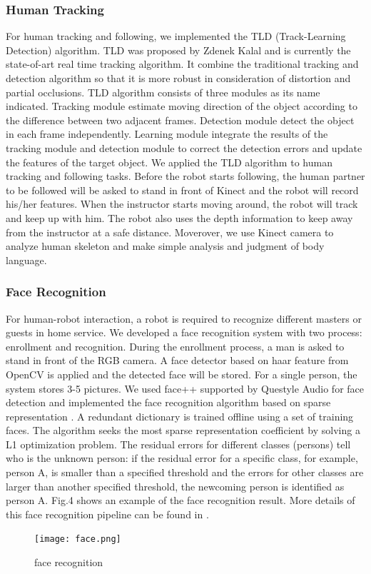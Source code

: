 \subsubsection{Human Tracking}
For human tracking and following, we implemented the TLD (Track-Learning Detection) algorithm\cite{kalal2012tracking}. TLD was proposed by Zdenek Kalal and is currently the state-of-art real time tracking algorithm. It combine the traditional tracking and detection algorithm so that it is more robust in consideration of distortion and partial occlusions. TLD algorithm consists of three modules as its name indicated. Tracking module estimate moving direction of the object according to the difference between two adjacent frames. Detection module detect the object in each frame independently. Learning module integrate the results of the tracking module and detection module to correct the detection errors and update the features of the target object.
We applied the TLD algorithm to human tracking and following tasks. Before the robot starts following, the human partner to be followed will be asked to stand in front of Kinect and the robot will record his/her features. When the instructor starts moving around, the robot will track and keep up with him. The robot also uses the depth information to keep away from the instructor at a safe distance.
Moverover, we use Kinect camera to analyze human skeleton and make simple analysis and judgment of body language. 
\subsubsection{Face Recognition}
For human-robot interaction, a robot is required to recognize different masters or guests in home service. We developed a face recognition system with two process: enrollment and recognition. During the enrollment process, a man is asked to stand in front of the RGB camera. A face detector based on haar feature from OpenCV is applied and the detected face will be stored. For a single person, the system stores 3-5 pictures.
We used face++ supported by Questyle Audio for face detection and implemented the face recognition algorithm based on sparse representation \cite{wright2009robust}. A redundant dictionary is trained offline using a set of training faces. The algorithm seeks the most sparse representation coefficient by solving a L1 optimization problem. The residual errors for different classes (persons) tell who is the unknown person: if the residual error for a specific class, for example, person A, is smaller than a specified threshold and the errors for other classes are larger than another specified threshold, the newcoming person is identified as person A. Fig.4 shows an example of the face recognition result. More details of this face recognition pipeline can be found in \cite{xia2015human}.
\begin{figure}[H]
	\centering
    \texttt{[image: face.png]}
    \caption{face recognition}
\end{figure}
